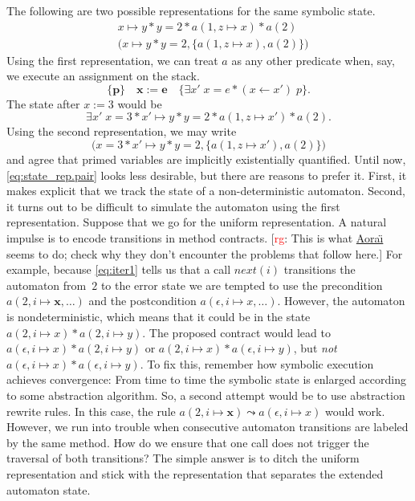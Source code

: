 \documentclass[a4paper]{article}
\newcommand{\rg}[1]{\todo{rg}{#1}}
\newcommand{\todo}[2]{{\small [\textcolor{red}{#1}: #2]}}
\theoremstyle{slanted}
\theoremstyle{definition}
\theoremstyle{remark}
\begin{document}
The following are two possible representations for the same symbolic state.
\begin{align}
& x\mapsto y * y = 2 * a(1, z\mapsto x) * a(2) 
  \label{eq:state_rep.star} \\
& \bigl(x\mapsto y * y = 2, \{a(1,z\mapsto x), a(2)\}\bigr)
  \label{eq:state_rep.pair}
\end{align}
Using the first representation, we can treat $a$ as any other predicate when, say, we execute an assignment on the stack.
  \[ \{\mathbf p\}\quad
  \mathbf x:=\mathbf e
  \quad\{\exists x'\;x=e * (x\gets x')\;p\}.\]
The state after $x:=3$ would be
  \[ \exists x'\; x = 3 * x'\mapsto y * y = 2 * a(1, z\mapsto x') * a(2). \]
Using the second representation, we may write
  \[ \bigl(x=3 * x'\mapsto y * y=2, \{a(1,z\mapsto x'), a(2)\}\bigr) \]
and agree that primed variables are implicitly existentially quantified.
Until now, \eqref{eq:state_rep.pair} looks less desirable, but there are reasons to prefer it. 
First, it makes explicit that we track the state of a non-deterministic automaton.
Second, it turns out to be difficult to simulate the automaton using the first representation.
Suppose that we go for the uniform representation.
A natural impulse is to encode transitions in method contracts.
\rg{This is what \href{http://amazones.gforge.inria.fr/aorai/aorai-manual.pdf}{Aora\"\i} seems to do; check why they don't encounter the problems that follow here.}
For example, because \eqref{eq:iter1} tells us that a call $\mathit{next}(i)$ transitions the automaton from~$2$ to the error state we are tempted to use the precondition $a(2,i\mapsto\mathbf{x}, \ldots)$ and the postcondition $a(\epsilon,i\mapsto x,\ldots)$.
However, the automaton is nondeterministic, which means that it could be in the state $a(2,i\mapsto x) * a(2,i\mapsto y)$.
The proposed contract would lead to $a(\epsilon,i\mapsto x) * a(2,i\mapsto y)$ or $a(2,i\mapsto x) * a(\epsilon,i\mapsto y)$, but \emph{not} $a(\epsilon,i\mapsto x) * a(\epsilon,i\mapsto y)$.
To fix this, remember how symbolic execution achieves convergence:
From time to time the symbolic state is enlarged according to some abstraction algorithm.
So, a second attempt would be to use abstraction rewrite rules.
In this case, the rule $a(2,i\mapsto\mathbf{x})\leadsto a(\epsilon,i\mapsto x)$ would work.
However, we run into trouble when consecutive automaton transitions are labeled by the same method.
How do we ensure that one call does not trigger the traversal of both transitions?
The simple answer is to ditch the uniform representation and stick with the representation that separates the extended automaton state.
\end{document}
